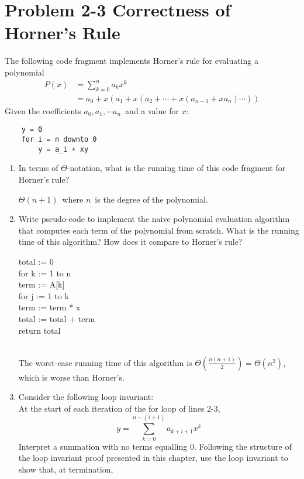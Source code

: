 \documentclass{article}
\newcommand{\?}{\stackrel{?}{=}}
\newcommand\Ans[2][]{%
   \leavevmode\noindent
   {
       \begin{mdframed}[backgroundcolor=blue!10]
       #2
       \end{mdframed}
   }
}
\begin{document}
\section{Problem 2-3 Correctness of Horner's Rule}
    The following code fragment implements Horner's rule for evaluating a polynomial
    \begin{align*}
        P(x) &= \sum_{k=0}^n a_kx^k \\
             &= a_0 + x(a_1 + x(a_2 + \cdots + x(a_{n-1} + xa_n)\cdots))
    \end{align*}
    Given the coefficients $a_0, a_1, \cdots a_n$\ and a value for $x$:
    \begin{verbatim}
    y = 0
    for i = n downto 0
        y = a_i + xy
    \end{verbatim}
    \begin{enumerate}
    	\item In terms of $\Theta$-notation, what is the running time of this code fragment for Horner's rule?
    	\Ans{$\Theta(n+1)$\ where $n$\ is the degree of the polynomial.}
    	\item Write pseudo-code to implement the naive polynomial evaluation algorithm that computes each term of the polynomial from scratch. What is the running time of this algorithm?  How does it compare to Horner's rule?
    	\Ans{
    	   \setlength{\parindent}{5ex}
    	   \begin{tt}
    	   	total := 0 \\
    	   	for k := 1 to n \\
    	   	\indent term := A[k] \\
    	   	\indent for j := 1 to k \\
    	   	\indent \indent term := term * x \\
    	   	\indent total := total + term \\
    	   	return total
    	   	\end{tt} \\
    	   	The worst-case running time of this algorithm is $\Theta\left(\frac{n(n+1)}{2}\right) = \Theta(n^2)$, which is worse than Horner's. 
    	}
    	\item Consider the following loop invariant: \\
    	At the start of each iteration of the for loop of lines 2-3,
    	\[
    	    y = \sum_{k=0}^{n-(i+1)} a_{k+i+1} x^k
    	\]
    	Interpret a summation with no terms equalling 0.  Following the structure of the loop invariant proof presented in this chapter, use the loop invariant to show that, at termination, 

\end{enumerate}
\end{document}
